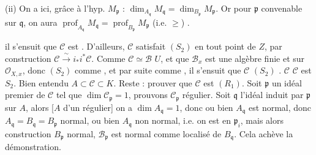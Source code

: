 \documentclass[11pt,a4paper]{article}
\begin{document}
(ii) On a ici, grâce à l'hyp.  $M_{\mathfrak{p}}$ \ill{} :
$\dim_{A_{\mathfrak{q}}} M_{\mathfrak{q}} = \dim_{B_{\mathfrak{p}}}
M_{\mathfrak{p}}$. Or pour $\mathfrak{p}$ convenable sur $\mathfrak{q}$, on
aura \ill{} \struck{\ill{}} $\operatorname{prof}_{A_{\mathfrak{q}}}
M_{\mathfrak{q}} = \operatorname{prof}_{B_{\mathfrak{p}}} M_{\mathfrak{p}}$
(i.e. \ill{} $\geq$) \ill{}.



il s'ensuit que $\mathcal{C}$ est . D'ailleurs,
$\mathcal{C}$ satisfait $(S_2)$ en tout point de $Z$,   \struck{\ill{}} par construction $\mathcal{C} \xrightarrow{\ \sim\ }
i_* i^* \mathcal{C}$. Comme $\mathcal{C} \simeq \mathcal{B}$ \ill{}
 $U$, \struck{\ill{}} et que $\mathcal{B}_x$ est une algèbre
finie et  sur $\mathcal{O}_{X, x}$, donc $(S_2)$ comme
, et par suite comme , il s'ensuit que
$\mathcal{C}$  $(S_2)$ 
. \struck{\ill{}} \ill{} 
 $\mathcal{C}$ \ill{} \ill{} $\mathcal{C}$ est $S_2$. Bien
entendu $A \subset \mathcal{C} \subset K$. Reste : prouver que $\mathcal{C}$
est  $(R_1)$. Soit $\mathfrak{p}$ un idéal premier de
$\mathcal{C}$ tel que $\dim \mathcal{C}_{\mathfrak{p}} = 1$, prouvons
$\mathcal{C}_{\mathfrak{p}}$ régulier. Soit $\mathfrak{q}$ l'idéal induit par
$\mathfrak{p}$ sur $A$, alors [$A$   d'un
régulier] on a $\dim A_{\mathfrak{q}} = 1$, donc ou bien $A_{\mathfrak{q}}$
est normal, donc $A_{\mathfrak{q}} = B_{\mathfrak{q}} = B_{\mathfrak{p}}$
\struck{\ill{}} normal, ou bien $A_{\mathfrak{q}}$ non normal, i.e. on est en
$\mathfrak{p}_i$, mais alors \ill{} \ill{}  construction
$B_{\mathfrak{p}}$ normal, \struck{\ill{}} $\mathcal{B}_{\mathfrak{p}}$ est
normal comme localisé de $B_{\mathfrak{q}}$. Cela achève la démonstration.
\end{document}
